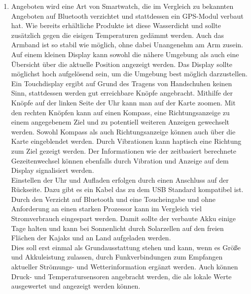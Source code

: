 \documentclass[a4paper,10pt]{article}
\begin{document}
\begin{enumerate}
\item Angeboten wird eine Art von Smartwatch, die im Vergleich zu bekannten Angeboten auf Bluetooth verzichtet und stattdessen ein GPS-Modul verbaut hat. Wie bereits erhältliche Produkte ist diese Wasserdicht und sollte zusätzlich gegen die eisigen Temperaturen gedämmt werden. Auch das Armband ist so stabil wie möglich, ohne dabei Unangenehm am Arm zusein.\\
Auf einem kleinen Display kann sowohl die nähere Umgebung als auch eine Übersicht über die aktuelle Position angezeigt werden. Das Display sollte möglichst hoch aufgelösend sein, um die Umgebung best möglich darzustellen. Ein Touchdisplay ergibt auf Grund des Tragens von Handschuhen keinen Sinn, stattdessen werden gut erreichbare Knöpfe angebracht. Mithilfe der Knöpfe auf der linken Seite der Uhr kann man auf der Karte zoomen. Mit den rechten Knöpfen kann auf einen Kompass, eine Richtungsanzeige zu einem angegebenem Ziel und zu potentiell weiteren Anzeigen gewechselt werden. Sowohl Kompass als auch Richtungsanzeige können auch über die Karte eingeblendet werden. Durch Vibrationen kann haptisch eine Richtung zum Ziel gezeigt werden. Der Informationen wie der zeitbasiert berechnete Gezeitenwechsel können ebenfalls durch Vibration und Anzeige auf dem Display signalisiert werden.\\
Einstellen der Uhr und Aufladen erfolgen durch einen Anschluss auf der Rückseite. Dazu gibt es ein Kabel das zu dem USB Standard kompatibel ist.\\
Durch den Verzicht auf Bluetooth und eine Toucheingabe und ohne Anforderung an einen starken Prozessor kann im Vergleich viel Stromverbrauch eingespart werden. Damit sollte der verbaute Akku einige Tage halten und kann bei Sonnenlicht durch Solarzellen auf den freien Flächen der Kajaks und an Land aufgeladen werden. \\
Dies soll erst einmal als Grundausstattung stehen und kann, wenn es Größe und Akkuleistung zulassen, durch Funkverbindungen zum Empfangen aktueller Strömungs- und Wetterinformation ergänzt werden. Auch können Druck- und Temperatursensoren angebracht werden, die als lokale Werte ausgewertet und angezeigt werden können.

\end{enumerate}
\end{document}
